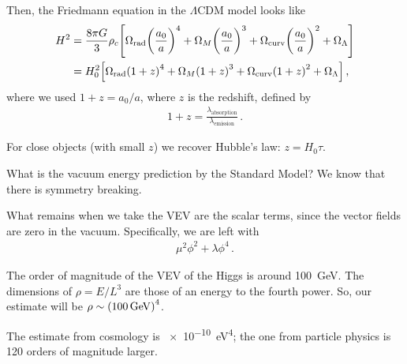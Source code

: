 \documentclass[main.tex]{subfiles}
\begin{document}
Then, the Friedmann equation in the \(\Lambda \)CDM model looks like 
%
\begin{align}
H^2 &= \frac{8 \pi G}{3} \rho_{c}
\qty[
    \Omega_{\text{rad}} \qty(\frac{a_0 }{a})^4    
    +\Omega_{M} \qty(\frac{a_0 }{a})^3    
    +\Omega_{\text{curv}} \qty(\frac{a_0 }{a})^2    
    +\Omega_\Lambda    
]  \\
&= H_0^2 \qty[
    \Omega_{\text{rad}} \qty(1 + z)^4    
    +\Omega_{M} \qty(1 + z)^3    
    +\Omega_{\text{curv}} \qty(1 + z)^2    
    +\Omega_\Lambda    
]
\,,
\end{align}
%
where we used \(1 + z = a_0 / a\), where \(z\) is the redshift, defined by 
%
\begin{align}
1 + z = \frac{\lambda _{\text{absorption}}}{\lambda _{\text{emission}}}
\,.
\end{align}

For close objects (with small \(z\)) we recover Hubble's law: \(z = H_0 \tau \).

What is the vacuum energy prediction by the Standard Model? 
We know that there is symmetry breaking. 

What remains when we take the VEV are the scalar terms, since the vector fields are zero in the vacuum. Specifically, we are left with 
%
\begin{align}
\mu^2 \phi^2 + \lambda \phi^{4}
\,.
\end{align}

The order of magnitude of the VEV of the Higgs is around \SI{100}{GeV}. 
The dimensions of \(\rho = E / L^3\) are those of an energy to the fourth power. So, our estimate will be \(\rho \sim \qty(\SI{100}{GeV})^{4}\). 

The estimate from cosmology is \SI{e-10}{eV^{4}}; the one from particle physics is 120 orders of magnitude larger.
\end{document}
